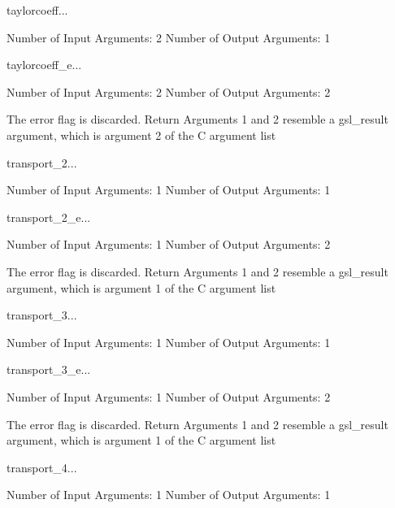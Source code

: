\begin{funcdesc}{taylorcoeff}{...}

    Number of Input  Arguments:  2
    Number of Output Arguments:  1
\end{funcdesc}

\begin{funcdesc}{taylorcoeff_e}{...}

    Number of Input  Arguments:  2
    Number of Output Arguments:  2

The error flag is discarded.
Return Arguments 1 and 2 resemble a gsl_result argument,
	which is  argument 2 of the C argument list

\end{funcdesc}

\begin{funcdesc}{transport_2}{...}

    Number of Input  Arguments:  1
    Number of Output Arguments:  1
\end{funcdesc}

\begin{funcdesc}{transport_2_e}{...}

    Number of Input  Arguments:  1
    Number of Output Arguments:  2

The error flag is discarded.
Return Arguments 1 and 2 resemble a gsl_result argument,
	which is  argument 1 of the C argument list

\end{funcdesc}

\begin{funcdesc}{transport_3}{...}

    Number of Input  Arguments:  1
    Number of Output Arguments:  1
\end{funcdesc}

\begin{funcdesc}{transport_3_e}{...}

    Number of Input  Arguments:  1
    Number of Output Arguments:  2

The error flag is discarded.
Return Arguments 1 and 2 resemble a gsl_result argument,
	which is  argument 1 of the C argument list

\end{funcdesc}

\begin{funcdesc}{transport_4}{...}

    Number of Input  Arguments:  1
    Number of Output Arguments:  1
\end{funcdesc}

